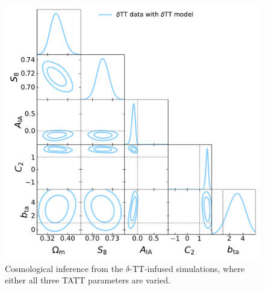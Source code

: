 \begin{figure}
\includegraphics[width=\columnwidth]{graphs/deltaTT.pdf}
\caption{Cosmological inference from the $\delta$-TT-infused simulations, where either all three TATT parameters are varied.}
\label{fig:corner_deltatt}
\end{figure}